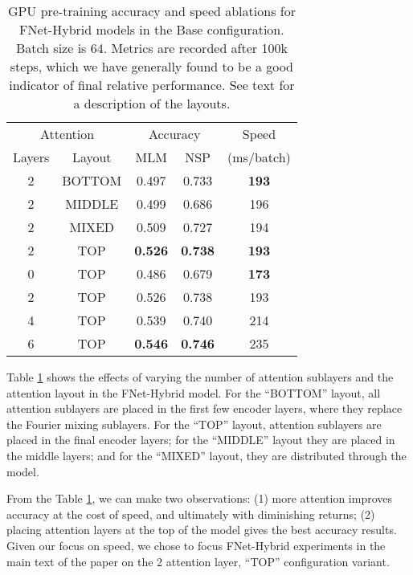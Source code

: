 \documentclass[11pt]{article}
\begin{document}
\begin{table}
    \caption{GPU pre-training accuracy and speed ablations for FNet-Hybrid models in the Base configuration. Batch size is 64. Metrics are recorded after 100k steps, which we have generally found to be a good indicator of final relative performance. See text for a description of the layouts.}
    \label{tab:hybrid_ablations}
    \setlength{\tabcolsep}{4pt}
    \centering
    \begin{tabular}{c c | c c | c}
        \hline
        \multicolumn{2}{c|}{Attention} & \multicolumn{2}{c|}{Accuracy} & Speed \\
        Layers & Layout & MLM & NSP & (ms/batch) \\ \hline \hline
        2 & BOTTOM & 0.497 & 0.733 & \textbf{193} \\
        2 & MIDDLE & 0.499 & 0.686 & 196 \\
        2 & MIXED & 0.509 &	0.727 &	194 \\
        2 & TOP & \textbf{0.526} &	\textbf{0.738} &	\textbf{193} \\ \hline
        0 & TOP & 0.486 &	0.679 &	\textbf{173} \\
        2 & TOP & 0.526 &	0.738 &	193 \\
        4 & TOP & 0.539 &	0.740 &	214 \\
        6 & TOP & \textbf{0.546} & \textbf{0.746}	& 235 \\ \hline
    \end{tabular}
\end{table}

Table \ref{tab:hybrid_ablations} shows the effects of varying the number of attention sublayers and the attention layout in the FNet-Hybrid model. For the ``BOTTOM'' layout, all attention sublayers are placed in the first few encoder layers, where they replace the Fourier mixing sublayers. For the ``TOP'' layout, attention sublayers are placed in the final encoder layers; for the ``MIDDLE'' layout they are placed in the middle layers; and for the ``MIXED'' layout, they are distributed through the model.

From the Table \ref{tab:hybrid_ablations}, we can make two observations: (1) more attention improves accuracy at the cost of speed, and ultimately with diminishing returns; (2) placing attention layers at the top of the model gives the best accuracy results. Given our focus on speed, we chose to focus FNet-Hybrid experiments in the main text of the paper on the 2 attention layer, ``TOP'' configuration variant.
\end{document}
